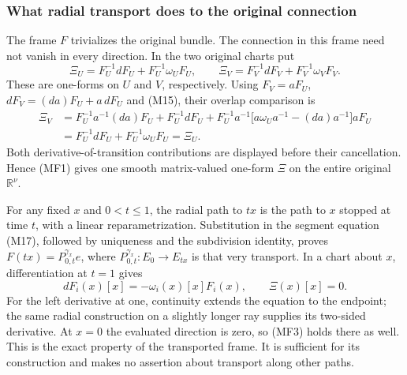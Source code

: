 \documentclass[
  11pt,
]{article}
\begin{document}
\subsubsection{What radial transport does to the original
connection}\label{what-radial-transport-does-to-the-original-connection}

The frame \(F\) trivializes the original bundle. The connection in this
frame need not vanish in every direction. In the two original charts put
\[
 \Xi_U=F_U^{-1}dF_U+F_U^{-1}\omega_UF_U,\qquad
 \Xi_V=F_V^{-1}dF_V+F_V^{-1}\omega_VF_V.
 \tag{MF1}
\] These are one-forms on \(U\) and \(V\), respectively. Using
\(F_V=aF_U\), \(dF_V=(da)F_U+a\,dF_U\) and (M15), their overlap
comparison is \[
 \begin{aligned}
 \Xi_V
 &=F_U^{-1}a^{-1}(da)F_U+F_U^{-1}dF_U
   +F_U^{-1}a^{-1}\bigl[a\omega_Ua^{-1}-(da)a^{-1}\bigr]aF_U\\
 &=F_U^{-1}dF_U+F_U^{-1}\omega_UF_U=\Xi_U.
 \end{aligned}
 \tag{MF2}
\] Both derivative-of-transition contributions are displayed before
their cancellation. Hence (MF1) gives one smooth matrix-valued one-form
\(\Xi\) on the entire original \(\mathbb R^\nu\).

For any fixed \(x\) and \(0<t\leq1\), the radial path to \(tx\) is the
path to \(x\) stopped at time \(t\), with a linear reparametrization.
Substitution in the segment equation (M17), followed by uniqueness and
the subdivision identity, proves \(F(tx)=P_{0,t}^{\gamma_x}e\), where
\(P_{0,t}^{\gamma_x}:E_0\to E_{tx}\) is that very transport. In a chart
about \(x\), differentiation at \(t=1\) gives \[
 dF_i(x)[x]=-\omega_i(x)[x]F_i(x),\qquad
 \Xi(x)[x]=0.
 \tag{MF3}
\] For the left derivative at one, continuity extends the equation to
the endpoint; the same radial construction on a slightly longer ray
supplies its two-sided derivative. At \(x=0\) the evaluated direction is
zero, so (MF3) holds there as well. This is the exact property of the
transported frame. It is sufficient for its construction and makes no
assertion about transport along other paths.
\end{document}
